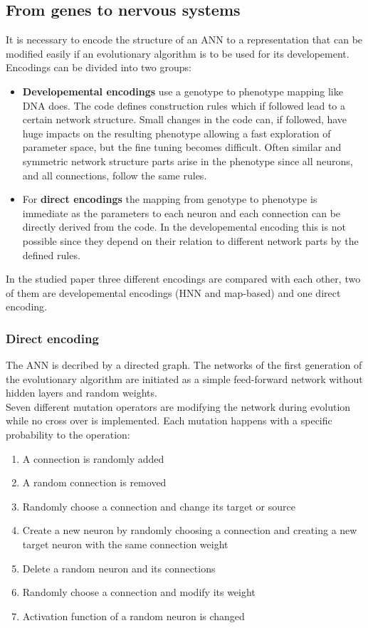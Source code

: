 \documentclass[12pt,twoside]{article}
\theoremstyle{plain}
\theoremstyle{definition}
\theoremstyle{remark}
\begin{document}
\subsection{From genes to nervous systems}
It is necessary to encode the structure of an ANN to a representation that can be modified easily if an evolutionary algorithm is to be used for its developement.
Encodings can be divided into two groups:
\begin{itemize}
	\item \textbf{Developemental encodings} use a genotype to phenotype mapping like DNA does. The code defines construction rules which if followed lead to a certain network structure. Small changes in the code can, if followed, have huge impacts on the resulting phenotype allowing a fast exploration of parameter space, but the fine tuning becomes difficult.
	Often similar and symmetric network structure parts arise in the phenotype since all neurons, and all connections, follow the same rules.
	\item For \textbf{direct encodings} the mapping from genotype to phenotype is immediate as the parameters to each neuron and each connection can be directly derived from the code. In the developemental encoding this is not possible since they depend on their relation to different network parts by the defined rules.
\end{itemize}
In the studied paper three different encodings are compared with each other, two of them are developemental encodings (HNN and map-based) and one direct encoding.

\subsubsection{Direct encoding}
The ANN is decribed by a directed graph. The networks of the first generation of the evolutionary algorithm are initiated as a simple feed-forward network without hidden layers and random weights.\\
Seven different mutation operators are modifying the network during evolution while no cross over is implemented.
Each mutation happens with a specific probability to the operation:
\begin{enumerate}
	\item A connection is randomly added
	\item A random connection is removed
	\item Randomly choose a connection and change its target or source
	\item Create a new neuron by randomly choosing a connection and creating a new target neuron with the same connection weight
	\item Delete a random neuron and its connections
	\item Randomly choose a connection and modify its weight
	\item Activation function of a random neuron is changed
\end{enumerate}
\end{document}
